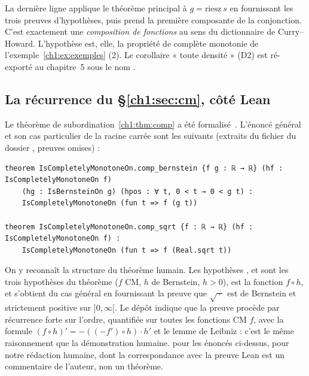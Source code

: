 La dernière ligne \og applique \fg{} le théorème principal à $g=\text{riesz}\ s$ en fournissant les trois preuves d'hypothèses, puis prend la première composante
 de la conjonction. C'est exactement une \emph{composition de fonctions} au sens du dictionnaire de Curry--Howard.
L'hypothèse  est, elle, la propriété de complète monotonie de l'exemple~\ref{ch1:ex:exemples} (2). Le corollaire « toute densité » (D2) est ré-exporté au chapitre~5 sous le nom .

\subsection{La récurrence du §\ref{ch1:sec:cm}, côté Lean}

Le théorème de subordination~\ref{ch1:thm:comp} a été formalisé~\cite{p3}. L'énoncé général et son cas particulier de la racine carrée sont les suivants
(extraits du fichier  du dossier \allowbreak{}, preuves omises) :

\begin{leanbox}
\begin{lstlisting}[language=Lean]
theorem IsCompletelyMonotoneOn.comp_bernstein {f g : ℝ → ℝ} (hf : IsCompletelyMonotoneOn f)
    (hg : IsBernsteinOn g) (hpos : ∀ t, 0 < t → 0 < g t) :
    IsCompletelyMonotoneOn (fun t => f (g t))

theorem IsCompletelyMonotoneOn.comp_sqrt {f : ℝ → ℝ} (hf : IsCompletelyMonotoneOn f) :
    IsCompletelyMonotoneOn (fun t => f (Real.sqrt t))
\end{lstlisting}
\end{leanbox}

On y reconnaît la structure du théorème humain. Les hypothèses ,  et  sont les trois
hypothèses du théorème ($f$ CM, $h$ de Bernstein, $h>0$),  est la fonction $f\circ h$, et  s'obtient du cas général en
fournissant la preuve que $\sqrt{\ \cdot\ }$ est de Bernstein et strictement positive sur $]0,\infty[$. Le dépôt indique que la preuve procède par récurrence
forte sur l'ordre, quantifiée sur toutes les fonctions CM $f$, avec la formule $(f\circ h)'=-((-f')\circ h)\cdot h'$ et le lemme de Leibniz : c'est
le même raisonnement que la démonstration humaine. \tierA{} pour les énoncés ci-dessus, \tierC{} pour notre rédaction humaine, dont la correspondance avec la
preuve Lean est un commentaire de l'auteur, non un théorème.

